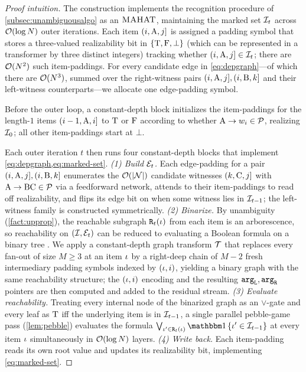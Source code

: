 \documentclass{article}
\begin{document}
\begin{proof}[Proof intuition]
    The construction implements the recognition procedure of \cref{subsec:unambiguousalgo} as an ${{\textsc{MAHAT}}}$, maintaining the marked set ${{\mathcal{I}}}_t$ across ${{ \mathcal{O}}}(\log {{ N}})$ outer iterations.
    Each item $({{ i}}, {{ \mathrm{A}}}, {{ j}}]$ is assigned a padding symbol that stores a three-valued realizability bit in ${{\{ {\mathbin{\mathrm{T}}},{\mathbin{\mathrm{F}}},\bot \}}}$ (which can be represented in a transformer by three distinct integers) tracking whether $({{ i}}, {{ \mathrm{A}}}, {{ j}}] \in {{\mathcal{I}}}_t$; there are ${{ \mathcal{O}}}({{ N}}^2)$ such item-paddings.
    For every candidate edge in \cref{eq:depgraph}---of which there are ${{ \mathcal{O}}}({{ N}}^3)$, summed over the right-witness pairs $({{ i}}, {{ \mathrm{A}}}, {{ j}}], ({{ i}}, {{ \mathrm{B}}}, {{ k}}]$ and their left-witness counterparts---we allocate one edge-padding symbol.
    
    Before the outer loop, a constant-depth block initializes the item-paddings for the length-$1$ items $({{ i}}-1, {{ \mathrm{A}}}, {{ i}}]$ to ${\mathbin{\mathrm{T}}}$ or ${\mathbin{\mathrm{F}}}$ according to whether ${{ {{ \mathrm{A}}} \rightarrow {w}_{{ i}}}} \in {{ \mathcal{P}}}$, realizing ${{\mathcal{I}}}_0$; all other item-paddings start at $\bot$.
    
    Each outer iteration $t$ then runs four constant-depth blocks that implement \cref{eq:depgraph,eq:marked-set}.
    \emph{(1) Build ${\mathcal{E}}_t$.}
    Each edge-padding for a pair $({{ i}}, {{ \mathrm{A}}}, {{ j}}], ({{ i}}, {{ \mathrm{B}}}, {{ k}}]$ enumerates the ${{ \mathcal{O}}}(|{{ \mathcal{N}}}|)$ candidate witnesses $({{ k}}, {{ \mathrm{C}}}, {{ j}}]$ with ${{ {{ \mathrm{A}}} \rightarrow {{ \mathrm{B}}}{{ \mathrm{C}}}}} \in {{ \mathcal{P}}}$ via a feedforward network, attends to their item-paddings to read off realizability, and flips its edge bit on when some witness lies in ${{\mathcal{I}}}_{t-1}$; the left-witness family is constructed symmetrically.
    \emph{(2) Binarize.}
    By unambiguity (\cref{fact:upprop}), the reachable subgraph ${\mathtt{R}}_t({{ \iota}})$ from each item is an arborescence, so reachability on $({{\mathcal{I}}}, {\mathcal{E}}_t)$ can be reduced to evaluating a Boolean formula on a binary tree \citep{chytil-unambiguous}.
    We apply a constant-depth graph transform ${{ \mathcal{T}}}$ that replaces every fan-out of size $M \ge 3$ at an item ${{ \iota}}$ by a right-deep chain of $M - 2$ fresh intermediary padding symbols indexed by $({{ \iota}}, i)$, yielding a binary graph with the same reachability structure; the $({{ \iota}}, i)$ encoding and the resulting ${\mathtt{arg}_\mathtt{L}}, {\mathtt{arg}_\mathtt{R}}$ pointers are then computed and added to the residual stream.
    \emph{(3) Evaluate reachability.}
    Treating every internal node of the binarized graph as an $\lor$-gate and every leaf as ${\mathbin{\mathrm{T}}}$ iff the underlying item is in ${{\mathcal{I}}}_{t-1}$, a single parallel pebble-game pass (\cref{lem:pebble}) evaluates the formula $\bigvee_{\itm' \in \reachable_t(\itm)} \ind{\itm' \in \items_{t-1}}$ at every item ${{ \iota}}$ simultaneously in ${{ \mathcal{O}}}(\log {{ N}})$ layers.
    \emph{(4) Write back.}
    Each item-padding reads its own root value and updates its realizability bit, implementing \cref{eq:marked-set}.
    

\end{proof}
\end{document}
